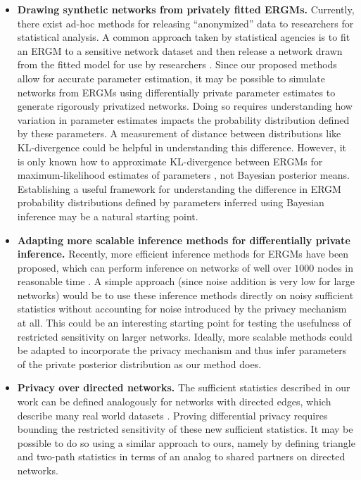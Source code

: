 \begin{itemize}
	\item \textbf{Drawing synthetic networks from privately fitted ERGMs.} Currently, there exist ad-hoc methods for releasing ``anonymized'' data to researchers for statistical analysis. A common approach taken by statistical agencies is to fit an ERGM to a sensitive network dataset and then release a network drawn from the fitted model for use by researchers \cite{ergm}. Since our proposed methods allow for accurate parameter estimation, it may be possible to simulate networks from ERGMs using differentially private parameter estimates to generate rigorously privatized networks. Doing so requires understanding how variation in parameter estimates impacts the probability distribution defined by these parameters. A measurement of distance between distributions like KL-divergence could be helpful in understanding this difference. However, it is only known how to approximate KL-divergence between ERGMs for maximum-likelihood estimates of parameters \cite{HG10}, not Bayesian posterior means. Establishing a useful framework for understanding the difference in ERGM probability distributions defined by parameters inferred using Bayesian inference may be a natural starting point.
	\item \textbf{Adapting more scalable inference methods for differentially private inference.} Recently, more efficient inference methods for ERGMs have been proposed, which can perform inference on networks of well over $1000$ nodes in reasonable time \cite{BFM17}. A simple approach (since noise addition is very low for large networks) would be to use these inference methods directly on noisy sufficient statistics without accounting for noise introduced by the privacy mechanism at all. This could be an interesting starting point for testing the usefulness of restricted sensitivity on larger networks. Ideally, more scalable methods could be adapted to incorporate the privacy mechanism and thus infer parameters of the private posterior distribution as our method does.
	\item \textbf{Privacy over directed networks.} The sufficient statistics described in our work can be defined analogously for networks with directed edges, which describe many real world datasets \cite{LKR12}. Proving differential privacy requires bounding the restricted sensitivity of these new sufficient statistics. It may be possible to do so using a similar approach to ours, namely by defining triangle and two-path statistics in terms of an analog to shared partners on directed networks. 

\end{itemize}
